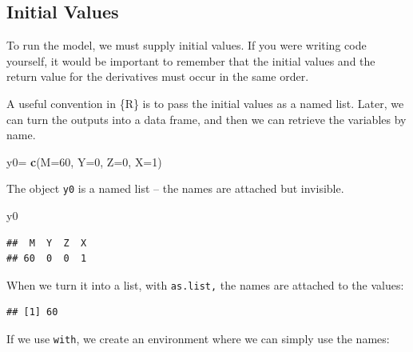 \documentclass[
]{book}
\newenvironment{Shaded}{\begin{snugshade}}{\end{snugshade}}
\newcommand{\AttributeTok}[1]{\textcolor[rgb]{0.13,0.29,0.53}{#1}}
\newcommand{\DecValTok}[1]{\textcolor[rgb]{0.00,0.00,0.81}{#1}}
\newcommand{\FunctionTok}[1]{\textcolor[rgb]{0.13,0.29,0.53}{\textbf{#1}}}
\newcommand{\NormalTok}[1]{#1}
\newcommand{\OtherTok}[1]{\textcolor[rgb]{0.56,0.35,0.01}{#1}}
\newcommand{\SpecialCharTok}[1]{\textcolor[rgb]{0.81,0.36,0.00}{\textbf{#1}}}
\begin{document}
\hypertarget{initial-values}{%
\subsection{Initial Values}\label{initial-values}}

To run the model, we must supply initial values. If you were writing code yourself, it would be important to remember that the initial values and the return value for the derivatives must occur in the same order.

A useful convention in \{R\} is to pass the initial values as a named list. Later, we can turn the outputs into a data frame, and then we can retrieve the variables by name.

\begin{Shaded}
\begin{Highlighting}[]
\NormalTok{y0}\OtherTok{=} \FunctionTok{c}\NormalTok{(}\AttributeTok{M=}\DecValTok{60}\NormalTok{, }\AttributeTok{Y=}\DecValTok{0}\NormalTok{, }\AttributeTok{Z=}\DecValTok{0}\NormalTok{, }\AttributeTok{X=}\DecValTok{1}\NormalTok{)}
\end{Highlighting}
\end{Shaded}

The object \texttt{y0} is a named list -- the names are attached but invisible.

\begin{Shaded}
\begin{Highlighting}[]
\NormalTok{y0}
\end{Highlighting}
\end{Shaded}

\begin{verbatim}
##  M  Y  Z  X 
## 60  0  0  1
\end{verbatim}

When we turn it into a list, with \texttt{as.list,} the names are attached to the values:

\begin{Shaded}
\end{Shaded}

\begin{verbatim}
## [1] 60
\end{verbatim}

If we use \texttt{with}, we create an environment where we can simply use the names:
\end{document}
